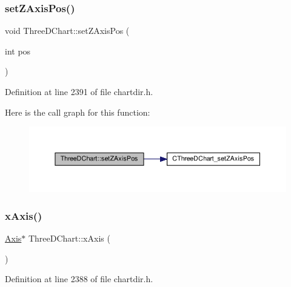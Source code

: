 \subsubsection{\texorpdfstring{set\+Z\+Axis\+Pos()}{setZAxisPos()}}
{\footnotesize\ttfamily void Three\+D\+Chart\+::set\+Z\+Axis\+Pos (\begin{DoxyParamCaption}\item[{int}]{pos }\end{DoxyParamCaption})\hspace{0.3cm}{\ttfamily [inline]}}



Definition at line 2391 of file chartdir.\+h.

Here is the call graph for this function\+:
\nopagebreak
\begin{figure}[H]
\begin{center}
\leavevmode
\includegraphics[width=350pt]{class_three_d_chart_a671db5985c3fa486e6e693153bf4ad18_cgraph}
\end{center}
\end{figure}
\mbox{\label{class_three_d_chart_a60544422121d19e5fdcf57de931cd123}} 
\subsubsection{\texorpdfstring{x\+Axis()}{xAxis()}}
{\footnotesize\ttfamily \hyperlink{class_axis}{Axis}$\ast$ Three\+D\+Chart\+::x\+Axis (\begin{DoxyParamCaption}{ }\end{DoxyParamCaption})\hspace{0.3cm}{\ttfamily [inline]}}



Definition at line 2388 of file chartdir.\+h.

